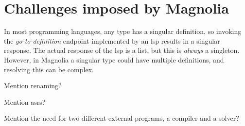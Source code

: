 \section{Challenges imposed by Magnolia}

In most programming languages, any type has a singular definition, so invoking
the \textit{go-to-definition} endpoint implemented by an \gls{lsp} results in a
singular response. The actual response of the \gls{lsp} is a list, but this is
\textit{always} a singleton. However, in Magnolia a singular type could have
multiple definitions, and resolving this can be complex.

Mention renaming?

Mention \gls{asr}s?

Mention the need for two different external programs, a compiler and a solver?
